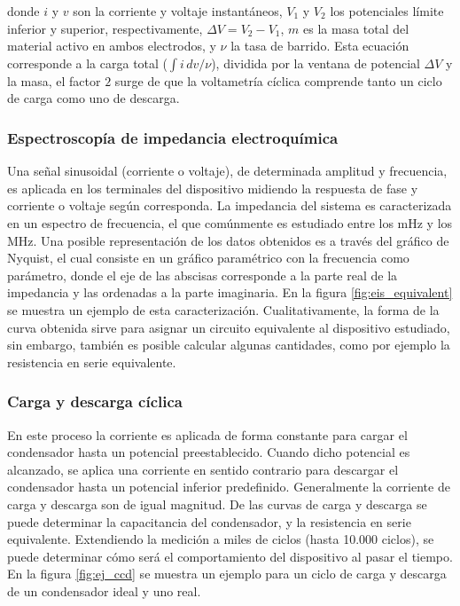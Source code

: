 donde $i$ y $v$ son la corriente y voltaje instantáneos, $V_1$ y $V_2$ los potenciales límite inferior y superior, respectivamente, $\Delta V = V_2 - V_1 $, $m$ es la masa total del material activo en ambos electrodos, y $\nu$ la tasa de barrido. Esta ecuación corresponde a la carga total ($\int i\, dv / \nu$), dividida por la ventana de potencial $\Delta V$ y la masa, el factor $2$ surge de que la voltametría cíclica comprende tanto un ciclo de carga como uno de descarga.

\subsubsection{Espectroscopía de impedancia electroquímica}
Una señal sinusoidal (corriente o voltaje), de determinada amplitud y frecuencia, es aplicada en los terminales del dispositivo midiendo la respuesta de fase y corriente o voltaje según corresponda. La impedancia del sistema es caracterizada en un espectro de frecuencia, el que comúnmente es estudiado entre los mHz y los MHz. Una posible representación de los datos obtenidos es a través del gráfico de Nyquist, el cual consiste en un gráfico paramétrico con la frecuencia como parámetro, donde el eje de las abscisas corresponde a la parte real de la impedancia y las ordenadas a la parte imaginaria. En la figura \ref{fig:eis_equivalent} se muestra un ejemplo de esta caracterización. Cualitativamente, la forma de la curva obtenida sirve para asignar un circuito equivalente al dispositivo estudiado, sin embargo, también es posible calcular algunas cantidades, como por ejemplo la resistencia en serie equivalente.

\subsubsection{Carga y descarga cíclica}
En este proceso la corriente es aplicada de forma constante para cargar el condensador hasta un potencial preestablecido. Cuando dicho potencial es alcanzado, se aplica una corriente en sentido contrario para descargar el condensador hasta un potencial inferior predefinido. Generalmente la corriente de carga y descarga son de igual magnitud. De las curvas de carga y descarga se puede determinar la capacitancia del condensador, y la resistencia en serie equivalente. Extendiendo la medición a miles de ciclos (hasta 10.000 ciclos), se puede determinar cómo será el comportamiento del dispositivo al pasar el tiempo. En la figura \ref{fig:ej_ccd} se muestra un ejemplo para un ciclo de carga y descarga de un condensador ideal y uno real.


